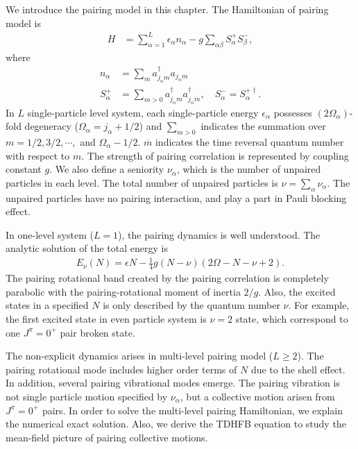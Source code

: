 \documentclass[11pt]{book} %
\begin{document}
We introduce the pairing model in this chapter. The Hamiltonian of pairing model is
\begin{align}
	H &= \sum_{\alpha=1}^L \epsilon_{\alpha} n_{\alpha} - g \sum_{\alpha\beta} S_{\alpha}^+ S_{\beta}^- ,
\end{align}
where
\begin{align}
	n_{\alpha} &= \sum_m a^{\dag}_{j_\alpha m}a_{j_\alpha m} \\
        S_{\alpha}^{+} &= \sum_{m>0}a_{j_\alpha m}^{\dag}a_{j_\alpha \overline{m}}^{\dag} ,
\quad   S_{\alpha}^{-} = S_{\alpha}^{+\dag} .
\label{S_+}
\end{align}
In $L$ single-particle level system, each single-particle energy $\epsilon_{\alpha}$ possesses $(2\Omega_{\alpha})$-fold
degeneracy ($\Omega_{\alpha}=j_{\alpha}+1/2$)
and $\sum_{m>0}$ indicates the summation over $m=1/2,3/2,\cdots,$ and $\Omega_{\alpha}-1/2$. $\overline{m}$ indicates the time reversal quantum number with respect to $m$. The strength of pairing correlation is represented by coupling constant $g$. We also define a seniority $\nu_{\alpha}$, which is the number of unpaired particles in each level. The total number of unpaired particles is $\nu=\sum_{\alpha}\nu_{\alpha}$. The unpaired particles have no pairing interaction, and play a part in Pauli blocking effect.\par
In one-level system ($L=1$), the pairing dynamics is well understood. The analytic solution of the total energy is
\begin{align}
	E_{\nu}(N) = \epsilon N - \frac{1}{4}g(N-\nu)(2\Omega-N-\nu+2) .
	\label{onelevel}
\end{align}
The pairing rotational band created by the pairing correlation is completely parabolic with the pairing-rotational moment of inertia $2/g$. Also, the excited states in a specified $N$ is only described by the quantum number $\nu$. For example, the first excited state in even particle system is $\nu=2$ state, which correspond to one $J^{\pi}=0^+$ pair broken state.\par
The non-explicit dynamics arises in multi-level pairing model ($L\ge 2$). The pairing rotational mode includes higher order terms of $N$ due to the shell effect. In addition, several pairing vibrational modes emerge. The pairing vibration is not single particle motion specified by $\nu_{\alpha}$, but a collective motion arisen from $J^{\pi}=0^+$ pairs. In order to solve the multi-level pairing Hamiltonian, we explain the numerical exact solution. Also, we derive the TDHFB equation to study the mean-field picture of pairing collective motions.
\end{document}
